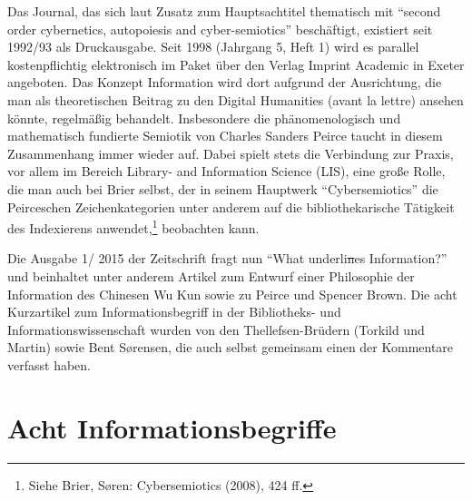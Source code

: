 \documentclass[a4paper,
fontsize=11pt,
oneside,
numbers=noperiodatend,
parskip=half-,
bibliography=totoc,
final
]{scrartcl}
\begin{document}
Das Journal, das sich laut Zusatz zum Hauptsachtitel thematisch mit
\enquote{second order cybernetics, autopoiesis and cyber-semiotics}
beschäftigt, existiert seit 1992/93 als Druckausgabe. Seit 1998
(Jahrgang 5, Heft 1) wird es parallel kostenpflichtig elektronisch im
Paket über den Verlag Imprint Academic in Exeter angeboten. Das Konzept
Information wird dort aufgrund der Ausrichtung, die man als
theoretischen Beitrag zu den Digital Humanities (avant la lettre)
ansehen könnte, regelmäßig behandelt. Insbesondere die phänomenologisch
und mathematisch fundierte Semiotik von Charles Sanders Peirce taucht in
diesem Zusammenhang immer wieder auf. Dabei spielt stets die Verbindung
zur Praxis, vor allem im Bereich Library- and Information Science (LIS),
eine große Rolle, die man auch bei Brier selbst, der in seinem Hauptwerk
\enquote{Cybersemiotics} die Peirceschen Zeichenkategorien unter anderem
auf die bibliothekarische Tätigkeit des Indexierens anwendet,\footnote{Siehe
  Brier, Søren: Cybersemiotics (2008), 424 ff.} beobachten kann.

Die Ausgabe 1/ 2015 der Zeitschrift fragt nun \enquote{What
underli\sout{n}es Information?} und beinhaltet unter anderem Artikel zum
Entwurf einer Philosophie der Information des Chinesen Wu Kun sowie zu
Peirce und Spencer Brown. Die acht Kurzartikel zum Informationsbegriff
in der Bibliotheks- und Informationswissenschaft wurden von den
Thellefsen-Brüdern (Torkild und Martin) sowie Bent Sørensen, die auch
selbst gemeinsam einen der Kommentare verfasst haben.

\section*{Acht
Informationsbegriffe}\label{acht-informationsbegriffe}
\end{document}
